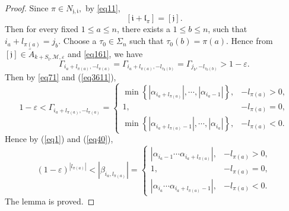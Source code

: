 \documentclass[11pt]{article}
\theoremstyle{plain}
\theoremstyle{definition}
\begin{document}
\begin{proof}
Since $\pi \in N_{\mathfrak{j}, \mathfrak{i}  },$ by \eqref{eq11},
\begin{equation*}\label{eq26}
[\mathfrak{i}+\mathfrak{l}_\pi]= [\mathfrak{j}].
\end{equation*}
Then for every fixed $1 \le a \le n$, there exists a $1 \le b \le n$, such that $i_{a}+l_{\pi  (a)}=j_{b}.$ Choose a $\tau_{0} \in \Sigma_{n}$ such that $\tau_{0}(b) = \pi (a)$. Hence from $[\mathfrak{j}] \in \tilde{A}_{k+S_{\mathfrak{l}},\mathscr{M},\varepsilon }$ and \eqref{eq161}, we have
\begin{equation}\label{eq3611}
\Gamma_{i_{a}+l_{\pi  (a)},-l_{\pi(a)}} =	\Gamma_{i_{a}+l_{\pi  (a)},-l_{\tau_0(b)}} = \Gamma_{j_{b},-l_{\tau_0(b)}} > 1 - \varepsilon.
\end{equation}
 Then by \eqref{eq71} and (\ref{eq3611}),
\begin{equation}\label{eq40}
1 - \varepsilon <\Gamma_{i_{a}+l_{\pi  (a)},-l_{\pi(a)}}= \begin{cases}
	\min \left \{ \left | \alpha _{i_{a}+l_{\pi(a)}} \right |, \cdots,\left | \alpha _{i_{a}-1} \right | \right \} ,&-l_{\pi(a)}> 0, \\
1 ,&-l_{\pi(a)}= 0, \\
	\min \left \{ \left | \alpha _{i_{a}+l_{\pi(a)}-1} \right |, \cdots,\left | \alpha _{i_{a}} \right | \right \},& -l_{\pi(a)} < 0.  
\end{cases}
\end{equation}
Hence by (\ref{eq1}) and (\ref{eq40}),
\begin{equation*}
\left ( 1 - \varepsilon \right ) ^{ |l_{\pi(a)}|  } <\left | \beta_{i_{a},l_{\pi  (a)}} \right |= \begin{cases}
	\left | \alpha _{i_{a}-1} \cdots \alpha _{i_{a}+l_{\pi(a)}} \right |,&-l_{\pi(a)}> 0, \\
1 ,&-l_{\pi(a)}= 0, \\
	\left | \alpha _{i_{a}} \cdots \alpha _{i_{a}+l_{\pi(a)}-1} \right |,& -l_{\pi(a)} < 0.  
\end{cases} 
\end{equation*}
The lemma is proved. \qedhere
\end{proof}
\end{document}

